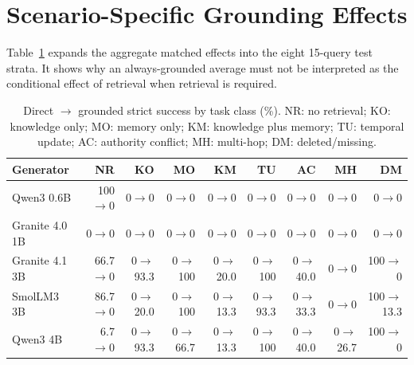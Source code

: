 \section{Scenario-Specific Grounding Effects}
\label{app:scenario-effects}

Table~\ref{tab:scenario-effects} expands the aggregate matched effects into the
eight 15-query test strata. It shows why an always-grounded average must not be
interpreted as the conditional effect of retrieval when retrieval is required.

\begin{table}[t]
\caption{Direct $\rightarrow$ grounded strict success by task class (\%). NR: no
retrieval; KO: knowledge only; MO: memory only; KM: knowledge plus memory; TU:
temporal update; AC: authority conflict; MH: multi-hop; DM: deleted/missing.}
\label{tab:scenario-effects}
\centering
\scriptsize
\begin{tabular}{@{}lrrrrrrrr@{}}
\toprule
Generator & NR & KO & MO & KM & TU & AC & MH & DM \\
\midrule
Qwen3 0.6B & 100$\rightarrow$0 & 0$\rightarrow$0 & 0$\rightarrow$0 & 0$\rightarrow$0 & 0$\rightarrow$0 & 0$\rightarrow$0 & 0$\rightarrow$0 & 0$\rightarrow$0 \\
Granite 4.0 1B & 0$\rightarrow$0 & 0$\rightarrow$0 & 0$\rightarrow$0 & 0$\rightarrow$0 & 0$\rightarrow$0 & 0$\rightarrow$0 & 0$\rightarrow$0 & 0$\rightarrow$0 \\
Granite 4.1 3B & 66.7$\rightarrow$0 & 0$\rightarrow$93.3 & 0$\rightarrow$100 & 0$\rightarrow$20.0 & 0$\rightarrow$100 & 0$\rightarrow$40.0 & 0$\rightarrow$0 & 100$\rightarrow$0 \\
SmolLM3 3B & 86.7$\rightarrow$0 & 0$\rightarrow$20.0 & 0$\rightarrow$100 & 0$\rightarrow$13.3 & 0$\rightarrow$93.3 & 0$\rightarrow$33.3 & 0$\rightarrow$0 & 100$\rightarrow$13.3 \\
Qwen3 4B & 6.7$\rightarrow$0 & 0$\rightarrow$93.3 & 0$\rightarrow$66.7 & 0$\rightarrow$13.3 & 0$\rightarrow$100 & 0$\rightarrow$40.0 & 0$\rightarrow$26.7 & 100$\rightarrow$0 \\
\bottomrule
\end{tabular}
\end{table}











\FloatBarrier
